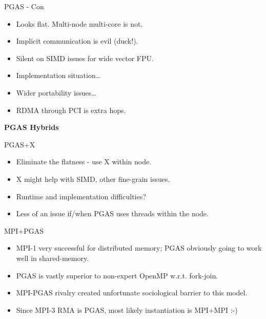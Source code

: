 \documentclass[11pt]{beamer}
\begin{document}
\begin{frame}{PGAS - Con} \Large
    \begin{itemize}
        \item Looks flat.  Multi-node multi-core is not.
        \item Implicit communication is evil (duck!).
        \item Silent on SIMD issues for wide vector FPU.
        \item Implementation situation\ldots
        \item Wider portability issues\ldots
        \item RDMA through PCI is extra hops.
    \end{itemize}
\end{frame}

\begin{frame}{} \LARGE
  \begin{center}
      \textbf{PGAS Hybrids}
  \end{center}
\end{frame}

\begin{frame}{PGAS+X} \Large
    \begin{itemize}
        \item Eliminate the flatness - use X within node.
        \item X might help with SIMD, other fine-grain issues.
        \item Runtime and implementation difficulties?
        \item Less of an issue if/when PGAS uses threads within the node.
    \end{itemize}
\end{frame}

\begin{frame}{MPI+PGAS} \Large
    \begin{itemize}
        \item MPI-1 very successful for distributed memory;
              PGAS obviously going to work well in shared-memory.
        \item PGAS is vastly superior to non-expert OpenMP w.r.t. fork-join.
        \item MPI-PGAS rivalry created unfortunate sociological barrier to this model.
        \item Since MPI-3 RMA is PGAS, most likely instantiation is MPI+MPI :-)
    \end{itemize}
\end{frame}
\end{document}
